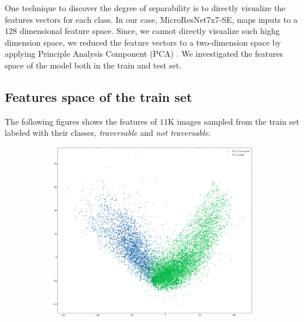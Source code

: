 \documentclass[../document.tex]{subfiles}
\begin{document}
One technique to discover the degree of separability is to directly visualize the features vectors for each class. In our case,  MicroResNet7x7-SE, maps inputs to a $128$ dimensional feature space.  Since, we cannot directly visualize such highg dimension space, we reduced the feature vectors to a two-dimension space by applying Principle Analysis Component (PCA) \cite{pca}. We investigated the features space of the model both in the train and test set.

\subsection{Features space of the train set}
The following figures shows the features of $11$K images sampled from the train set labeled with their classes, \emph{traversable} and \emph{not traversable}. 
\begin{figure} [htbp]
    \centering
    \begin{subfigure}[b]{1\textwidth}
        \includegraphics[width=\linewidth]{../img/5/pca/pca.png}
    \end{subfigure}
    \begin{subfigure}[b]{0.48\textwidth}

\end{subfigure}
\end{figure}
\end{document}
